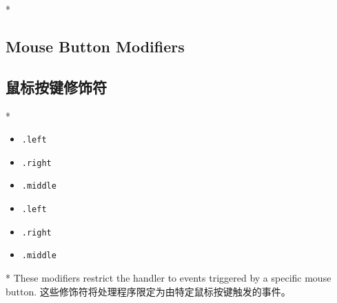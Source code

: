 \begin{paracol}{2}
\switchcolumn[0]*%
\subsection{Mouse Button Modifiers}
\switchcolumn
\subsection{鼠标按键修饰符}
\switchcolumn[0]*%
\begin{itemize}
\item
    \texttt{.left}
\item
    \texttt{.right}
\item
    \texttt{.middle}
\end{itemize}
\switchcolumn
\begin{itemize}
\item
    \texttt{.left}
\item
    \texttt{.right}
\item
    \texttt{.middle}
\end{itemize}
\switchcolumn[0]*%
These modifiers restrict the handler to events triggered by a specific
mouse button.
\switchcolumn
这些修饰符将处理程序限定为由特定鼠标按键触发的事件。
\end{paracol}
